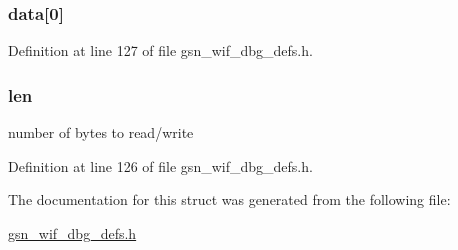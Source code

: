 \hypertarget{a00331_a29500e452cff835f2b70d1dff36f918a}{
\subsubsection[{data}]{ {\bf data}\mbox{[}0\mbox{]}}}
\label{a00331_a29500e452cff835f2b70d1dff36f918a}


Definition at line 127 of file gsn\_\-wif\_\-dbg\_\-defs.h.

\hypertarget{a00331_ab9abc6ede61238a05664f9c37e4412c3}{
\subsubsection[{len}]{ {\bf len}}}
\label{a00331_ab9abc6ede61238a05664f9c37e4412c3}
number of bytes to read/write 

Definition at line 126 of file gsn\_\-wif\_\-dbg\_\-defs.h.



The documentation for this struct was generated from the following file:\begin{DoxyCompactItemize}
\item 
\hyperlink{a00609}{gsn\_\-wif\_\-dbg\_\-defs.h}\end{DoxyCompactItemize}
